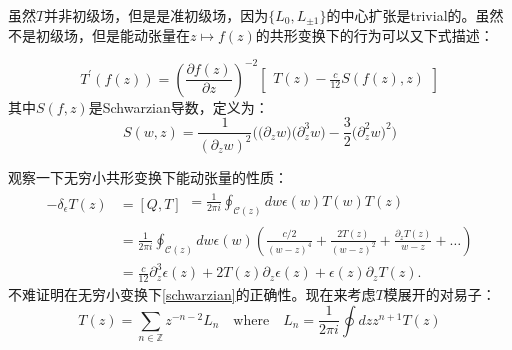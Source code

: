 虽然$T$并非初级场，但是是准初级场，因为$\{L_0,L_{\pm1}\}$的中心扩张是trivial的。虽然不是初级场，但是能动张量在$z\mapsto f(z)$的共形变换下的行为可以又下式描述：
\begin{theorem}
	\begin{equation}\label{schwarzian}
		\boxed{
			T^\prime(f(z))=\left(\frac{\partial f(z)}{\partial z}\right)^{-2}\begin{bmatrix}T(z)-\frac{c}{12}S(f(z),z)\end{bmatrix}
		}
	\end{equation}
	其中$S(f,z)$是Schwarzian导数，定义为：
	\begin{equation}
		\boxed{
			S(w,z)=\frac1{(\partial_zw)^2}\Big(\big(\partial_zw\big)\big(\partial_z^3w\big)-\frac32\big(\partial_z^2w\big)^2\big)
		}
	\end{equation}
\end{theorem}
观察一下无穷小共形变换下能动张量的性质：
\begin{equation}
	\begin{aligned}
		-\delta_{\epsilon}T(z)&=[Q,T]\begin{aligned}=\frac{1}{2\pi i}\oint_{\mathcal{C}(z)}dw\epsilon(w)T(w)T(z)\end{aligned}  \\
		&=\frac{1}{2\pi i}\oint_{\mathcal{C}(z)}dw\epsilon(w)\left(\frac{c/2}{(w-z)^{4}}+\frac{2T(z)}{(w-z)^{2}}+\frac{\partial_{z}T(z)}{w-z}+\ldots\right) \\
		&=\frac{c}{12}\partial_{z}^{3}\epsilon(z)+2T(z)\partial_{z}\epsilon(z)+\epsilon(z)\partial_{z}T(z).
	\end{aligned}
\end{equation}
不难证明在无穷小变换下\ref{schwarzian}的正确性。现在来考虑$T$模展开的对易子：
\begin{equation}
	T(z)=\sum_{n\in\mathbb{Z}}z^{-n-2}L_n\quad\text{where}\quad L_n=\frac{1}{2\pi i}\oint dzz^{n+1}T(z)
\end{equation}
